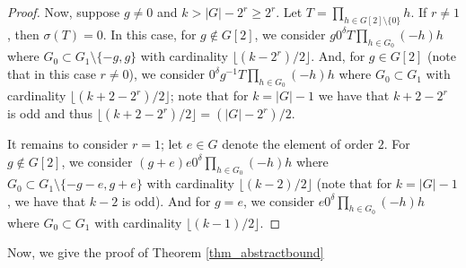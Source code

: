 \documentclass{amsart}
\theoremstyle{definition}
\numberwithin{equation}{section}
\begin{document}
\begin{proof}
Now, suppose $g \neq 0$ and $k > |G| - 2^r \ge 2^r$.
Let $T=\prod_{h \in G[2]\setminus \{0\}}h$.
If $r\neq 1$, then $\sigma(T)=0$.
In this case, for $g \notin G[2]$, we consider $g0^{\delta}T\prod_{h\in G_0}(-h)h$ where
$G_0 \subset G_1 \setminus \{ -g, g \}$ with cardinality $ \lfloor (k-2^r)/2 \rfloor $.
And, for $g \in G[2]$ (note that in this case $r\neq 0$), we consider  $0^{\delta}g^{-1}T\prod_{h\in G_0}(-h)h$ where $G_0 \subset G_1$ with cardinality $\lfloor (k+2-2^r)/2 \rfloor $; note that
for $k=|G|-1$ we have that $k + 2 -2^r$ is odd and thus $ \lfloor (k+2-2^r)/2 \rfloor = (|G| - 2^r)/2$.

It remains to consider $r=1$; let $e\in G$ denote the element of order $2$.
For $g \notin G[2]$, we consider $(g+e)e0^{\delta}\prod_{h\in G_0}(-h)h$ where
$G_0 \subset G_1 \setminus \{-g-e,g+e\}$ with cardinality $ \lfloor (k-2)/2 \rfloor $ (note that for $k=|G|-1$, we have that $k-2$ is odd).
And for $g=e$, we consider $e0^{\delta}\prod_{h\in G_0}(-h)h$ where $G_0 \subset G_1$ with cardinality $ \lfloor (k-1)/2 \rfloor $.
\end{proof}

Now, we give the proof of Theorem \ref{thm_abstractbound}
\end{document}

